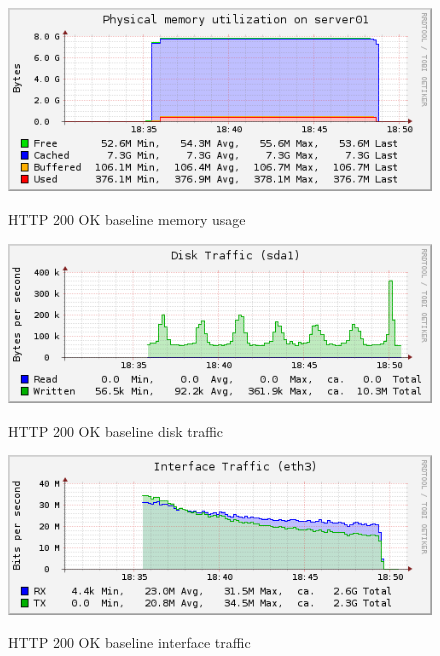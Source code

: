 \documentclass[Measurements]{subfiles}
\begin{document}
\begin{figure}[H]
\centering
\caption{HTTP 200 OK baseline memory usage}
\includegraphics[scale=0.7]{images/results/200_with_naxsi_incremented_allowed_parameters/memory.png}
\label{fig:Baseline Nginx memory usage}
\end{figure}

\begin{figure}[H]
\centering
\caption{HTTP 200 OK baseline disk traffic}
\includegraphics[scale=0.7]{images/results/200_with_naxsi_incremented_allowed_parameters/disk.png}
\label{fig:Baseline Nginx disk traffic}
\end{figure}

\begin{figure}[H]
\centering
\caption{HTTP 200 OK baseline interface traffic}
\includegraphics[scale=0.7]{images/results/200_with_naxsi_incremented_allowed_parameters/interface.png}
\label{fig:Baseline Nginx interface traffic}
\end{figure}
\end{document}
